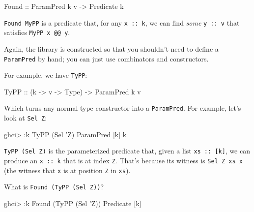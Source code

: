 \documentclass[]{article}
\newenvironment{Shaded}{}{}
\newcommand{\DataTypeTok}[1]{\textcolor[rgb]{0.56,0.13,0.00}{#1}}
\newcommand{\FunctionTok}[1]{\textcolor[rgb]{0.02,0.16,0.49}{#1}}
\newcommand{\NormalTok}[1]{#1}
\newcommand{\OtherTok}[1]{\textcolor[rgb]{0.00,0.44,0.13}{#1}}
\begin{document}
\begin{Shaded}
\begin{Highlighting}[]
\DataTypeTok{Found}\OtherTok{ ::} \DataTypeTok{ParamPred}\NormalTok{ k v }\OtherTok{->} \DataTypeTok{Predicate}\NormalTok{ k}
\end{Highlighting}
\end{Shaded}

\texttt{Found\ MyPP} is a predicate that, for any \texttt{x\ ::\ k}, we can find
\emph{some} \texttt{y\ ::\ v} that satisfies \texttt{MyPP\ x\ @@\ y}.

Again, the library is constructed so that you shouldn't need to define a
\texttt{ParamPred} by hand; you can just use combinators and constructors.

For example, we have \texttt{TyPP}:

\begin{Shaded}
\begin{Highlighting}[]
\DataTypeTok{TyPP}\OtherTok{ ::}\NormalTok{ (k }\OtherTok{->}\NormalTok{ v }\OtherTok{->} \DataTypeTok{Type}\NormalTok{) }\OtherTok{->} \DataTypeTok{ParamPred}\NormalTok{ k v}
\end{Highlighting}
\end{Shaded}

Which turns any normal type constructor into a \texttt{ParamPred}. For example,
let's look at \texttt{Sel\ \textquotesingle{}Z}:

\begin{Shaded}
\begin{Highlighting}[]
\NormalTok{ghci}\FunctionTok{>} \FunctionTok{:}\NormalTok{k }\DataTypeTok{TyPP}\NormalTok{ (}\DataTypeTok{Sel}\NormalTok{ '}\DataTypeTok{Z}\NormalTok{)}
\DataTypeTok{ParamPred}\NormalTok{ [k] k}
\end{Highlighting}
\end{Shaded}

\texttt{TyPP\ (Sel\ \textquotesingle{}Z)} is the parameterized predicate that,
given a list \texttt{xs\ ::\ {[}k{]}}, we can produce an \texttt{x\ ::\ k} that
is at index \texttt{\textquotesingle{}Z}. That's because its witness is
\texttt{Sel\ \textquotesingle{}Z\ xs\ x} (the witness that \texttt{x} is at
position \texttt{\textquotesingle{}Z} in \texttt{xs}).

What is \texttt{Found\ (TyPP\ (Sel\ \textquotesingle{}Z))}?

\begin{Shaded}
\begin{Highlighting}[]
\NormalTok{ghci}\FunctionTok{>} \FunctionTok{:}\NormalTok{k }\DataTypeTok{Found}\NormalTok{ (}\DataTypeTok{TyPP}\NormalTok{ (}\DataTypeTok{Sel}\NormalTok{ '}\DataTypeTok{Z}\NormalTok{))}
\DataTypeTok{Predicate}\NormalTok{ [k]}
\end{Highlighting}
\end{Shaded}
\end{document}
